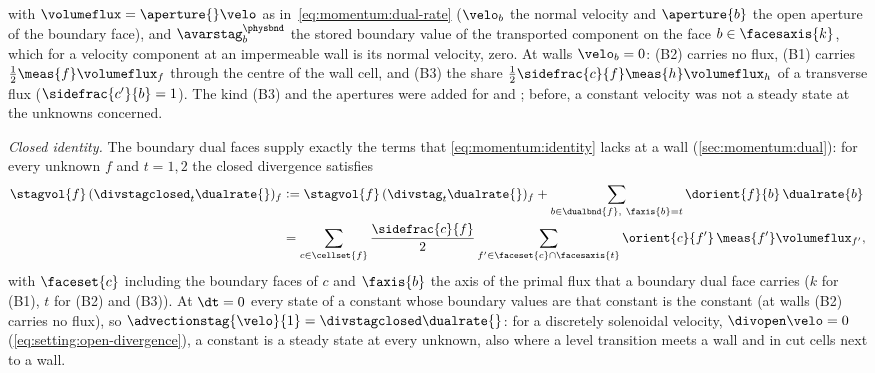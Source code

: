 with $\volumeflux=\aperture{}\velo$ as in~\cref{eq:momentum:dual-rate}
($\velo_b$ the normal velocity and $\aperture{b}$ the open aperture of the
boundary face), and $\avarstag^{\physbnd}_b$ the stored boundary value of the
transported component on the face $b\in\facesaxis{k}$, which for a velocity
component at an impermeable wall is its normal velocity, zero. At walls
$\velo_b=0$: (B2) carries no flux, (B1) carries $\half\meas{f}\volumeflux_f$
through the centre of the wall cell, and (B3) the share
$\half\sidefrac{c}{f}\meas{h}\volumeflux_h$ of a transverse flux
($\sidefrac{c'}{b}=1$). The kind (B3) and the apertures were added for
 and ; before, a constant velocity was not a steady state
at the unknowns concerned.

\emph{Closed identity.} The boundary dual faces supply exactly the terms that
\cref{eq:momentum:identity} lacks at a wall (\cref{sec:momentum:dual}): for
every unknown $f$ and $t=1,2$ the closed divergence satisfies
\begin{equation}\label{eq:momentum:closed-identity}
  \begin{aligned}
  \stagvol{f}\,(\divstagclosed_t\dualrate{})_f
  &\defeq\stagvol{f}\,(\divstag_t\dualrate{})_f
    +\sum_{b\in\dualbnd{f},\ \faxis{b}=t}\dorient{f}{b}\,\dualrate{b}\\
  &=\sum_{c\in\cellset{f}}\frac{\sidefrac{c}{f}}{2}
    \sum_{f'\in\faceset{c}\cap\facesaxis{t}}\orient{c}{f'}\,\meas{f'}\volumeflux_{f'},
  \end{aligned}
\end{equation}
with $\faceset{c}$ including the boundary faces of $c$ and $\faxis{b}$ the
axis of the primal flux that a boundary dual face carries ($k$ for (B1), $t$
for (B2) and (B3)). At $\dt=0$ every state of a constant whose boundary
values are that constant is the constant (at walls (B2) carries no flux), so
$\advectionstag{\velo}{1}=\divstagclosed\dualrate{}$: for a discretely
solenoidal velocity, $\divopen\velo=0$ (\cref{eq:setting:open-divergence}),
a constant is a steady state at every unknown, also where a level transition
meets a wall and in cut cells next to a wall.

